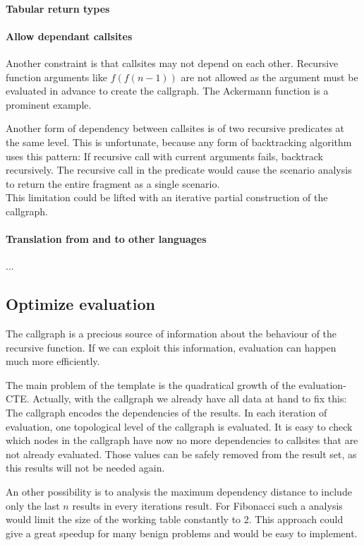 \paragraph*{Tabular return types}

\paragraph*{Allow dependant callsites}
Another constraint is that callsites may not depend on each other. Recursive function arguments like $f(f(n-1))$ are not allowed as the argument must be evaluated in advance to create the callgraph. The Ackermann function is a prominent example.

Another form of dependency between callsites is of two recursive predicates at the same level. This is unfortunate, because any form of backtracking algorithm uses this pattern: If recursive call with current arguments fails, backtrack recursively. The recursive call in the predicate would cause the scenario analysis to return the entire fragment as a single scenario.\\
This limitation could be lifted with an iterative partial construction of the callgraph.

\paragraph*{Translation from and to other languages}
...

\subsection{Optimize evaluation}

The callgraph is a precious source of information about the behaviour of the recursive function. If we can exploit this information, evaluation can happen much more efficiently.

The main problem of the template is the quadratical growth of the evaluation-CTE. Actually, with the callgraph we already have all data at hand to fix this: The callgraph encodes the dependencies of the results. In each iteration of evaluation, one topological level of the callgraph is evaluated. It is easy to check which nodes in the callgraph have now no more dependencies to callsites that are not already evaluated. Those values can be safely removed from the result set, as this results will not be needed again.

An other possibility is to analysis the maximum dependency distance to include only the last $n$ results in every iterations result. For Fibonacci such a analysis would limit the size of the working table constantly to 2. This approach could give a great speedup for many benign problems and would be easy to implement.

